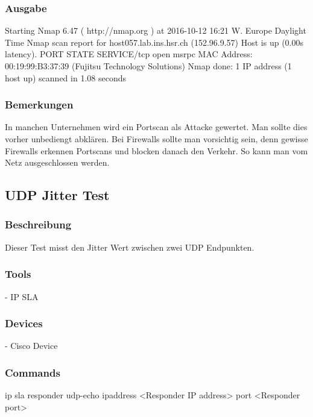 \documentclass[a4,12pt]{scrartcl}
\begin{document}
\subsubsection{Ausgabe}
Starting Nmap 6.47 ( http://nmap.org ) at 2016-10-12 16:21 W. Europe Daylight Time\newline
Nmap scan report for host057.lab.ins.hsr.ch (152.96.9.57)\newline
Host is up (0.00s latency).\newline
PORT    STATE SERVICE/tcp open  msrpc\newline
MAC Address: 00:19:99:B3:37:39 (Fujitsu Technology Solutions)\newline
Nmap done: 1 IP address (1 host up) scanned in 1.08 seconds\newline
\subsubsection{Bemerkungen}
In manchen Unternehmen wird ein Portscan als Attacke gewertet. Man sollte dies vorher unbediengt abklären.
Bei Firewalls sollte man vorsichtig sein, denn gewisse Firewalls erkennen Portscans und blocken danach den Verkehr. So kann man vom Netz ausgeschlossen werden.

\subsection{UDP Jitter Test}
\subsubsection{Beschreibung}
Dieser Test misst den Jitter Wert zwischen zwei UDP Endpunkten.
\subsubsection{Tools}
- IP SLA
\subsubsection{Devices}
- Cisco Device
\subsubsection{Commands}
\hfill

\noindent ip sla responder udp-echo ipaddress <Responder IP address> port <Responder port>\\
\end{document}
